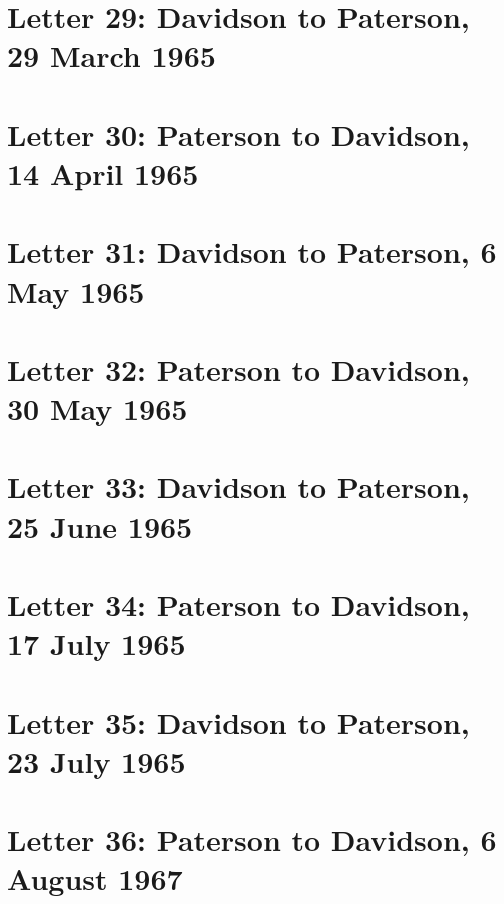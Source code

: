 \documentclass[a4paper,11pt,abstracton,hidelinks]{scrartcl}
\begin{document}
\section{Letter 29: Davidson to Paterson, 29 March 1965}


\section{Letter 30: Paterson to Davidson, 14 April 1965}


\section{Letter 31: Davidson to Paterson, 6 May 1965}


\section{Letter 32: Paterson to Davidson, 30 May 1965}


\section{Letter 33: Davidson to Paterson, 25 June 1965}


\section{Letter 34: Paterson to Davidson, 17 July 1965}


\section{Letter 35: Davidson to Paterson, 23 July 1965}


\section{Letter 36: Paterson to Davidson, 6 August 1967}

\end{document}
